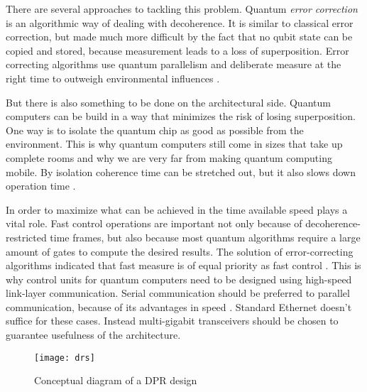 There are several approaches to tackling this problem. Quantum \textit{error correction} is an algorithmic way of dealing with decoherence. It is similar to classical error correction, but made much more difficult by the fact that no qubit state can be copied and stored, because measurement leads to a loss of superposition. Error correcting algorithms use quantum parallelism and deliberate measure at the right time to outweigh environmental influences \cite[see][pp. 328f]{Rie98}. 

But there is also something to be done on the architectural side. Quantum computers can be build in a way that minimizes the risk of losing superposition. One way is to isolate the quantum chip as good as possible from the environment. This is why quantum computers still come in sizes that take up complete rooms and why we are very far from making quantum computing mobile. By isolation coherence time can be stretched out, but it also slows down operation time \cite[see][p. 39]{Meter06}. 

In order to maximize what can be achieved in the time available speed plays a vital role. Fast control operations are important not only because of decoherence-restricted time frames, but also because most quantum algorithms require a large amount of gates to compute the desired results. The solution of error-correcting algorithms indicated that fast measure is of equal priority as fast control \cite[see][pp. 33f]{Meter06}. This is why control units for quantum computers need to be designed using high-speed link-layer communication. Serial communication should be preferred to parallel communication, because of its advantages in speed \cite[cp.][p. 66]{Cai02}. Standard Ethernet doesn't suffice for these cases. Instead multi-gigabit transceivers should be chosen to guarantee usefulness of the architecture.

\begin{figure}[h]
  \centering
      \texttt{[image: drs]}
  \caption[\acs{DPR} design] {Conceptual diagram of a \acs{DPR} design \cite[p. 97:3]{Gong14}}
  \label{fig:drs}
\end{figure}


